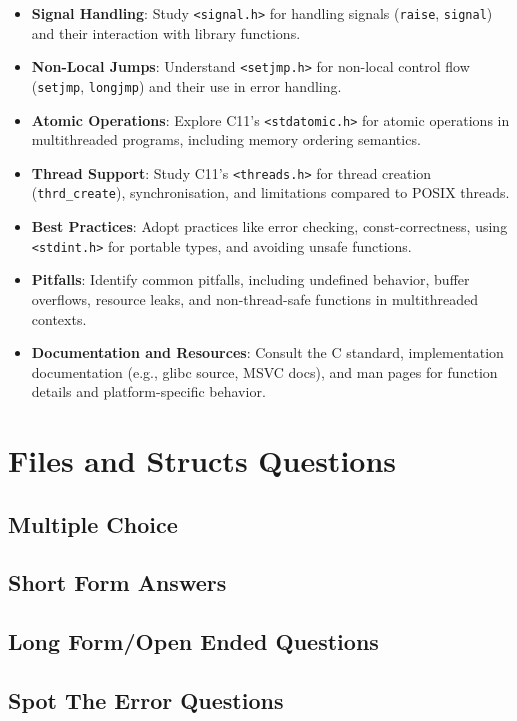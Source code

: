 \documentclass[a4paper,12pt]{article}
\begin{document}
\begin{itemize}[noitemsep]
    \item \textbf{Signal Handling}: Study \texttt{<signal.h>} for handling signals (\texttt{raise}, \texttt{signal}) and their interaction with library functions.

    \item \textbf{Non-Local Jumps}: Understand \texttt{<setjmp.h>} for non-local control flow (\texttt{setjmp}, \texttt{longjmp}) and their use in error handling.

    \item \textbf{Atomic Operations}: Explore C11’s \texttt{<stdatomic.h>} for atomic operations in multithreaded programs, including memory ordering semantics.

    \item \textbf{Thread Support}: Study C11’s \texttt{<threads.h>} for thread creation (\texttt{thrd\_create}), synchronisation, and limitations compared to POSIX threads.

    \item \textbf{Best Practices}: Adopt practices like error checking, const-correctness, using \texttt{<stdint.h>} for portable types, and avoiding unsafe functions.

    \item \textbf{Pitfalls}: Identify common pitfalls, including undefined behavior, buffer overflows, resource leaks, and non-thread-safe functions in multithreaded contexts.

    \item \textbf{Documentation and Resources}: Consult the C standard, implementation documentation (e.g., glibc source, MSVC docs), and man pages for function details and platform-specific behavior.
\end{itemize}

\newpage

\section{Files and Structs Questions}

\subsection{Multiple Choice}

\subsection{Short Form Answers}

\subsection{Long Form/Open Ended Questions}

\subsection{Spot The Error Questions}
\end{document}
